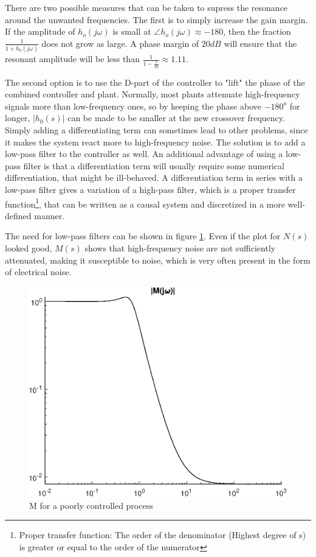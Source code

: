 \noindent
There are two possible measures that can be taken to supress the resonance around the unwanted frequencies. The first is to simply increase the gain margin. If the amplitude of $h_o(j \omega)$ is small at $\angle h_o(j \omega) \approx -180$, then the fraction $\frac{1}{1 + h_0(j \omega)}$ does not grow as large. A phase margin of $20dB$ will ensure that the resonant amplitude will be less than $\frac{1}{1 - \frac{1}{10}} \approx 1.11$. 

\noindent
The second option is to use the D-part of the controller to "lift" the phase of the combined controller and plant. Normally, most plants attenuate high-frequency signals more than low-frequency ones, so by keeping the phase above $-180^o$ for longer, $|h_0(s)|$ can be made to be smaller at the new crossover frequency. Simply adding a differentiating term can sometimes lead to other problems, since it makes the system react more to high-frequency noise. The solution is to add a low-pass filter to the controller as well. An additional advantage of using a low-pass filter is that a differentiation term will usually require some numerical differentiation, that might be ill-behaved. A differentiation term in series with a low-pass filter gives a variation of a high-pass filter, which is a proper transfer function\footnote{Proper transfer function: The order of the denominator (Highest  degree of s) is greater or equal to the order of the numerator}, that can be written as a causal system and discretized in a more well-defined manner. 


\noindent

The need for low-pass filters can be shown in figure \ref{fig:M_plot}. Even if the plot for $N(s)$ looked good, $M(s)$ shows that high-frequency noise are not sufficiently attenuated, making it susceptible to noise, which is very often present in the form of electrical noise. 

\begin{figure}[!ht]
    \includegraphics[width=\textwidth]{img/Fig_dump/Generic_M_plot.eps}
    \caption{M for a poorly controlled process}
    \label{fig:M_plot}
\end{figure}


